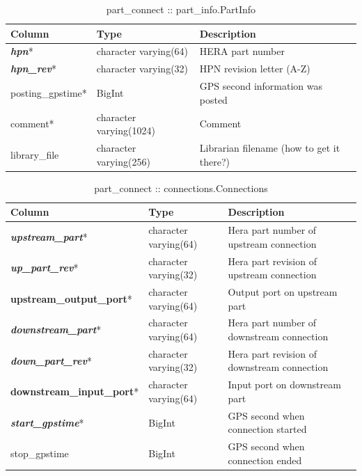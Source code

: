 \documentclass{article}[10pt]
\begin{document}
\begin{table}[h]
\centering
\caption{part\_connect :: part\_info.PartInfo}
\begin{tabular}{| l | l | l |} \hline
{\bf Column} & {\bf Type} & {\bf Description} \\ \hline
{\bf \em hpn}* & character varying(64) & HERA part number \\ \hline
{\bf \em hpn\_rev}* & character varying(32) & HPN revision letter (A-Z) \\ \hline
posting\_gpstime* & BigInt & GPS second information was posted \\ \hline
comment* &  character varying(1024) & Comment \\ \hline
library\_file & character varying(256) &  Librarian filename (how to get it there?) \\ \hline
\end{tabular}
\end{table}

\begin{table}[h]
\centering
\caption{part\_connect :: connections.Connections}
\begin{tabular}{| l | l | l |} \hline
{\bf Column} & {\bf Type} & {\bf Description} \\ \hline
{\bf \em upstream\_part}* &  character varying(64) & Hera part number of upstream connection \\ \hline
{\bf \em up\_part\_rev}* & character varying(32) & Hera part revision of upstream connection \\ \hline
{\bf upstream\_output\_port}* & character varying(64) & Output port on upstream part \\ \hline
{\bf \em downstream\_part}* & character varying(64) & Hera part number of downstream connection \\ \hline
{\bf \em down\_part\_rev}* & character varying(32) & Hera part revision of downstream connection \\ \hline
{\bf downstream\_input\_port}* & character varying(64) & Input port on downstream part \\ \hline
{\bf \em start\_gpstime}* & BigInt & GPS second when connection started \\ \hline
stop\_gpstime & BigInt & GPS second when connection ended \\ \hline
\end{tabular}
\end{table}
\end{document}
